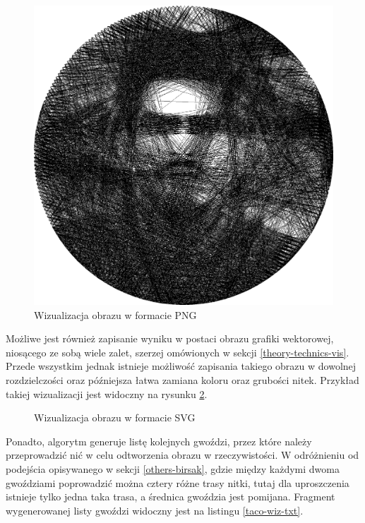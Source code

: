     \begin{figure}[H]
        \centering
        \includegraphics[width=\textwidth,keepaspectratio]{img/4-mine/taco-vis/taco_e_i3000_c20_inv0_bg1_obj100_ed255.png}
        \caption{Wizualizacja obrazu w formacie PNG}
        \label{taco-wiz-png}
    \end{figure}
    
    Możliwe jest również zapisanie wyniku w postaci obrazu grafiki wektorowej, niosącego ze sobą wiele zalet, szerzej omówionych w sekcji \ref{theory-technics-vis}. Przede wszystkim jednak istnieje możliwość zapisania takiego obrazu w dowolnej rozdzielczości oraz późniejsza łatwa zamiana koloru oraz grubości nitek. Przykład takiej wizualizacji jest widoczny na rysunku \ref{taco-wiz-svg}.
    
    \begin{figure}[H]
        \centering
        
        \caption{Wizualizacja obrazu w formacie SVG}
        \label{taco-wiz-svg}
    \end{figure}
    
    Ponadto, algorytm generuje listę kolejnych gwoździ, przez które należy przeprowadzić nić w celu odtworzenia obrazu w rzeczywistości. W odróżnieniu od podejścia opisywanego w sekcji \ref{others-birsak}, gdzie między każdymi dwoma gwoździami poprowadzić można cztery różne trasy nitki, tutaj dla uproszczenia istnieje tylko jedna taka trasa, a średnica gwoździa jest pomijana. Fragment wygenerowanej listy gwoździ widoczny jest na listingu \ref{taco-wiz-txt}.
   
